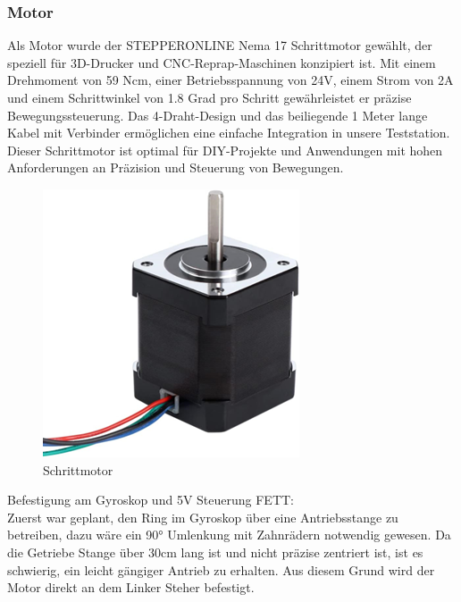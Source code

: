 \subsubsection{Motor}
Als Motor wurde der STEPPERONLINE Nema 17 Schrittmotor\autocite{Schrittmotor} gewählt, der speziell für 3D-Drucker und CNC-Reprap-Maschinen konzipiert ist. Mit einem Drehmoment von 59 Ncm, einer Betriebsspannung von 24V, einem Strom von 2A und einem Schrittwinkel von 1.8 Grad pro Schritt gewährleistet er präzise Bewegungssteuerung. Das 4-Draht-Design und das beiliegende 1 Meter lange Kabel mit Verbinder ermöglichen eine einfache Integration in unsere Teststation. Dieser Schrittmotor ist optimal für DIY-Projekte und Anwendungen mit hohen Anforderungen an Präzision und Steuerung von Bewegungen.
\begin{figure}[H]
    \centering
    \includegraphics{image/schrittmotor.png}
    \caption{Schrittmotor}
    \label{fig:enter-label}
\end{figure}
Befestigung am Gyroskop und 5V Steuerung FETT:\\
\vspace{3mm}
Zuerst war geplant, den Ring im Gyroskop über eine Antriebsstange zu betreiben, dazu wäre ein 90° Umlenkung mit Zahnrädern notwendig gewesen. Da die Getriebe Stange über 30cm lang ist und nicht präzise zentriert ist, ist es schwierig, ein leicht gängiger Antrieb zu erhalten. Aus diesem Grund wird der Motor direkt an dem Linker Steher befestigt. \\
\vspace{3mm}
